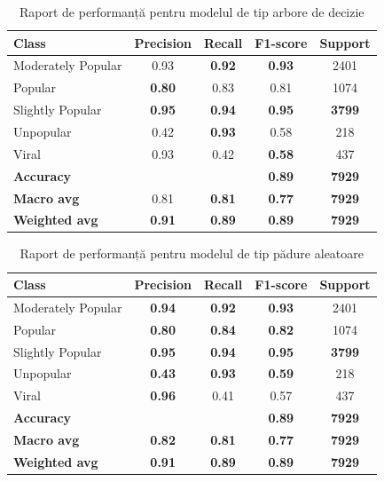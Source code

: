 \documentclass{article}
\begin{document}
\begin{table}[ht]
\centering
\begin{tabular}{lcccc}
\hline
\textbf{Class} & \textbf{Precision} & \textbf{Recall} & \textbf{F1-score} & \textbf{Support} \\
\hline
Moderately Popular   & 0.93 & \textbf{0.92} & \textbf{0.93} & 2401 \\
Popular              & \textbf{0.80} & 0.83 & 0.81 & 1074 \\
Slightly Popular     & \textbf{0.95} & \textbf{0.94} & \textbf{0.95} & \textbf{3799} \\
Unpopular            & 0.42 & \textbf{0.93} & 0.58 & 218  \\
Viral                & 0.93 & 0.42 & \textbf{0.58} & 437  \\
\hline
\textbf{Accuracy}    &      &      & \textbf{0.89} & \textbf{7929} \\
\textbf{Macro avg}   & 0.81 & \textbf{0.81} & \textbf{0.77} & \textbf{7929} \\
\textbf{Weighted avg}& \textbf{0.91} & \textbf{0.89} & \textbf{0.89} & \textbf{7929} \\
\hline
\end{tabular}
\caption{Raport de performanță pentru modelul de tip arbore de decizie}
\end{table}

\begin{table}[ht]
\centering
\begin{tabular}{lcccc}
\hline
\textbf{Class} & \textbf{Precision} & \textbf{Recall} & \textbf{F1-score} & \textbf{Support} \\
\hline
Moderately Popular   & \textbf{0.94} & \textbf{0.92} & \textbf{0.93} & 2401 \\
Popular              & \textbf{0.80} & \textbf{0.84} & \textbf{0.82} & 1074 \\
Slightly Popular     & \textbf{0.95} & \textbf{0.94} & \textbf{0.95} & \textbf{3799} \\
Unpopular            & \textbf{0.43} & \textbf{0.93} & \textbf{0.59} & 218  \\
Viral                & \textbf{0.96} & 0.41 & 0.57 & 437  \\
\hline
\textbf{Accuracy}    &      &      & \textbf{0.89} & \textbf{7929} \\
\textbf{Macro avg}   & \textbf{0.82} & \textbf{0.81} & \textbf{0.77} & \textbf{7929} \\
\textbf{Weighted avg}& \textbf{0.91} & \textbf{0.89} & \textbf{0.89} & \textbf{7929} \\
\hline
\end{tabular}
\caption{Raport de performanță pentru modelul de tip pădure aleatoare}
\end{table}
\end{document}
